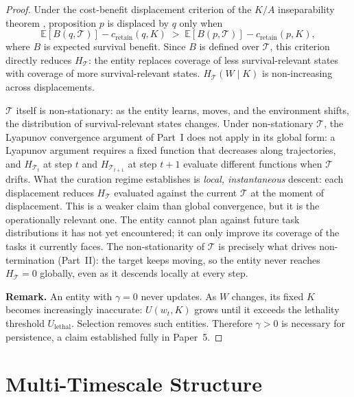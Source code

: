 \documentclass[11pt]{article}
\theoremstyle{definition}
\begin{document}
\begin{proof}
Under the cost-benefit displacement criterion of the $K/A$
inseparability theorem \cite{McCarthy2026c}, proposition $p$ is
displaced by $q$ only when
\[
  \mathbb{E}[B(q, \mathcal{T})] - c_{\text{retain}}(q, K)
  \;>\;
  \mathbb{E}[B(p, \mathcal{T})] - c_{\text{retain}}(p, K),
\]
where $B$ is expected survival benefit. Since $B$ is defined over
$\mathcal{T}$, this criterion directly reduces $H_{\mathcal{T}}$: the
entity replaces coverage of less survival-relevant states with coverage
of more survival-relevant states. $H_{\mathcal{T}}(W \mid K)$ is non-increasing across displacements.

$\mathcal{T}$ itself is non-stationary: as the entity learns, moves,
and the environment shifts, the distribution of survival-relevant
states changes. Under non-stationary $\mathcal{T}$, the Lyapunov
convergence argument of Part~I does not apply in its global form: a
Lyapunov argument requires a fixed function that decreases along
trajectories, and $H_{\mathcal{T}_t}$ at step $t$ and
$H_{\mathcal{T}_{t+1}}$ at step $t+1$ evaluate different functions
when $\mathcal{T}$ drifts. What the curation regime establishes is
\emph{local, instantaneous} descent: each displacement reduces
$H_{\mathcal{T}}$ evaluated against the current $\mathcal{T}$ at the
moment of displacement. This is a weaker claim than global
convergence, but it is the operationally relevant one. The entity
cannot plan against future task distributions it has not yet
encountered; it can only improve its coverage of the tasks it currently
faces. The non-stationarity of $\mathcal{T}$ is precisely what drives
non-termination (Part~II): the target keeps moving, so the entity
never reaches $H_{\mathcal{T}} = 0$ globally, even as it descends
locally at every step.

\textbf{Remark.} An entity with $\gamma = 0$ never updates. As $W$
changes, its fixed $K$ becomes increasingly inaccurate: $U(w_t, K)$
grows until it exceeds the lethality threshold $U_{\mathrm{lethal}}$.
Selection removes such entities. Therefore $\gamma > 0$ is necessary for
persistence, a claim established fully in Paper~5.
\end{proof}

\section{Multi-Timescale Structure}
\label{sec:multiscale}
\end{document}
